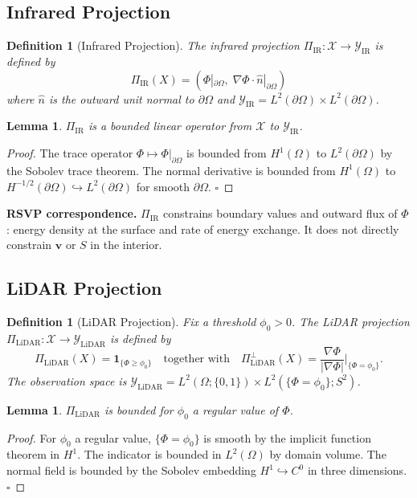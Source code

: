 \documentclass[12pt, oneside]{article}
\newtheorem{lemma}[theorem]{Lemma}
\newtheorem{definition}[theorem]{Definition}
\begin{document}
\subsection{Infrared Projection}

\begin{definition}[Infrared Projection]
The infrared projection $\Pi_{\mathrm{IR}} : \mathcal{X} \to \mathcal{Y}_{\mathrm{IR}}$
is defined by
\[
\Pi_{\mathrm{IR}}(X) = \left( \Phi|_{\partial\Omega},\;
\nabla\Phi \cdot \hat{n}|_{\partial\Omega} \right)
\]
where $\hat{n}$ is the outward unit normal to $\partial\Omega$ and
$\mathcal{Y}_{\mathrm{IR}} = L^2(\partial\Omega) \times L^2(\partial\Omega)$.
\end{definition}

\begin{lemma}
$\Pi_{\mathrm{IR}}$ is a bounded linear operator from $\mathcal{X}$ to $\mathcal{Y}_{\mathrm{IR}}$.
\end{lemma}
\begin{proof}
The trace operator $\Phi \mapsto \Phi|_{\partial\Omega}$ is bounded from $H^1(\Omega)$
to $L^2(\partial\Omega)$ by the Sobolev trace theorem. The normal derivative is bounded
from $H^1(\Omega)$ to $H^{-1/2}(\partial\Omega) \hookrightarrow L^2(\partial\Omega)$ for
smooth $\partial\Omega$. $\square$
\end{proof}

\textbf{RSVP correspondence.} $\Pi_{\mathrm{IR}}$ constrains boundary values and outward
flux of $\Phi$: energy density at the surface and rate of energy exchange. It does not
directly constrain $\mathbf{v}$ or $S$ in the interior.

\subsection{LiDAR Projection}

\begin{definition}[LiDAR Projection]
Fix a threshold $\phi_0 > 0$. The LiDAR projection
$\Pi_{\mathrm{LiDAR}} : \mathcal{X} \to \mathcal{Y}_{\mathrm{LiDAR}}$ is defined by
\[
\Pi_{\mathrm{LiDAR}}(X) = \mathbf{1}_{\{\Phi \ge \phi_0\}}
\quad \text{together with} \quad
\Pi_{\mathrm{LiDAR}}^{\perp}(X) =
\frac{\nabla\Phi}{|\nabla\Phi|}\bigg|_{\{\Phi = \phi_0\}}.
\]
The observation space is
$\mathcal{Y}_{\mathrm{LiDAR}} = L^2(\Omega;\{0,1\}) \times L^2(\{\Phi=\phi_0\};S^2)$.
\end{definition}

\begin{lemma}
$\Pi_{\mathrm{LiDAR}}$ is bounded for $\phi_0$ a regular value of $\Phi$.
\end{lemma}
\begin{proof}
For $\phi_0$ a regular value, $\{\Phi = \phi_0\}$ is smooth by the implicit function
theorem in $H^1$. The indicator is bounded in $L^2(\Omega)$ by domain volume. The normal
field is bounded by the Sobolev embedding $H^1 \hookrightarrow C^0$ in three dimensions.
$\square$
\end{proof}
\end{document}
